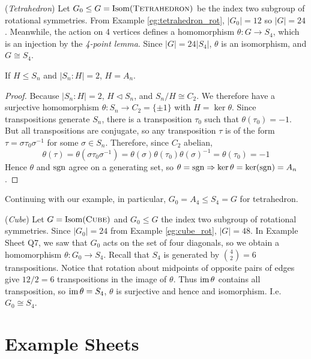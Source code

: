 \documentclass[10pt, a4paper, twoside]{report}
\begin{document}
\begin{example}
    (\emph{Tetrahedron}) Let \(G_0\leq G=\operatorname{Isom}(\textsc{Tetrahedron})\) be the index two subgroup of rotational symmetries. From Example \ref{eg:tetrahedron_rot}, \(|G_0|=12\) so \(|G|=24\). Meanwhile, the action on 4 vertices defines a homomorphism \(\theta:G\to S_4\), which is an injection by the \emph{4-point lemma}. Since \(|G|=24|S_4|\), \(\theta\) is an isomorphism, and \(G\cong S_4\).
\end{example}
\begin{lemma}
    If \(H\leq S_n\) and \(|S_n:H|=2\), \(H=A_n\).
\end{lemma}
\begin{proof}
    Because \(|S_n:H|=2\), \(H\lhd S_n\), and \(S_n/H\cong C_2\). We therefore have a surjective homomorphism \(\theta:S_n\to C_2=\{\pm 1\}\) with \(H=\ker\theta\). Since transpositions generate \(S_n\), there is a transposition \(\tau_0\) such that \(\theta(\tau_0)=-1\). But all transpositions are conjugate, so any transposition \(\tau\) is of the form \(\tau=\sigma\tau_0\sigma^{-1}\) for some \(\sigma\in S_n\). Therefore, since \(C_2\) abelian,
    \[\theta(\tau)=\theta(\sigma\tau_0\sigma^{-1})=\theta(\sigma)\theta(\tau_0)\theta(\sigma)^{-1}=\theta(\tau_0)=-1\]
    Hence \(\theta\) and \(\operatorname{sgn}\) agree on a generating set, so \(\theta=\operatorname{sgn}\Rightarrow \ker\theta=\ker(\operatorname{sgn})=A_n\).
\end{proof}
Continuing with our example, in particular, \(G_0=A_4\leq S_4=G\) for tetrahedron.
\begin{example}
    (\emph{Cube}) Let \(G=\operatorname{Isom}(\textsc{Cube})\) and \(G_0\leq G\) the index two subgroup of rotational symmetries. Since \(|G_0|=24\) from Example \ref{eg:cube_rot}, \(|G|=48\). In Example Sheet Q7, we saw that \(G_0\) acts on the set of four diagonals, so we obtain a homomorphism \(\theta:G_0\to S_4\). Recall that \(S_4\) is generated by \(\binom 42=6\) transpositions. Notice that rotation about midpoints of opposite pairs of edges give \(12/2=6\) transpositions in the image of \(\theta\). Thus \(\operatorname{im}\theta\) contains all transposition, so \(\operatorname{im}\theta=S_4\), \(\theta\) is surjective and hence and isomorphism. I.e. \(G_0\cong S_4\).
\end{example}
\newpage
\section{Example Sheets}
\end{document}
